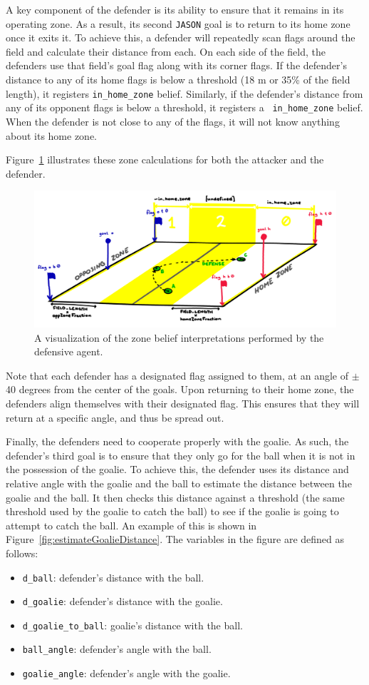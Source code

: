 \documentclass[conference]{IEEEtran}
\begin{document}
A key component of the defender is its ability to ensure that it remains in its operating zone. As a result, its second \texttt{JASON} goal is to return to its home zone once it exits it. To achieve this, a defender will repeatedly scan flags around the field and calculate their distance from each. On each side of the field, the defenders use that field's goal flag along with its corner flags. If the defender's distance to any of its home flags is below a threshold (18 m or 35\% of the field length), it registers \texttt{in\_home\_zone} belief. Similarly, if the defender's distance from any of its opponent flags is below a threshold, it registers a \texttt{~in\_home\_zone} belief. When the defender is not close to any of the flags, it will not know anything about its home zone. 

Figure~\ref{fig:defenderZones} illustrates these zone calculations for both the attacker and the defender.

\begin{figure}[ht!]
    \centering\centerline{\includegraphics[width=.5\textwidth]{Figures/zone_demonstration.png}}
    \caption{A visualization of the zone belief interpretations performed by the defensive agent.}
    \label{fig:defenderZones}
\end{figure}

Note that each defender has a designated flag assigned to them, at an angle of $\pm$ 40 degrees from the center of the goals. Upon returning to their home zone, the defenders align themselves with their designated flag. This ensures that they will return at a specific angle, and thus be spread out.

Finally, the defenders need to cooperate properly with the goalie. As such, the defender's third goal is to ensure that they only go for the ball when it is not in the possession of the goalie. To achieve this, the defender uses its distance and relative angle with the goalie and the ball to estimate the distance between the goalie and the ball. It then checks this distance against a threshold (the same threshold used by the goalie to catch the ball) to see if the goalie is going to attempt to catch the ball. An example of this is shown in Figure~\ref{fig:estimateGoalieDistance}. The variables in the figure are defined as follows: 
\begin{itemize}
\item \texttt{d\_ball}: defender's distance with the ball.
\item \texttt{d\_goalie}: defender's distance with the goalie.
\item \texttt{d\_goalie\_to\_ball}: goalie's distance with the ball.
\item \texttt{ball\_angle}: defender's angle with the ball.
\item \texttt{goalie\_angle}: defender's angle with the goalie.
\end{itemize}
\end{document}
